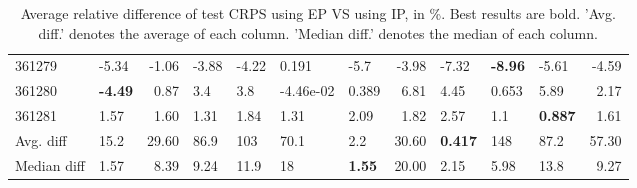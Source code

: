 \begin{table}[ht!]
\begin{tabular}{llrllllrlllr}
  361279 & -5.34 & -1.06 & -3.88 & -4.22 & 0.191 & -5.7 & -3.98 & -7.32 & \textbf{-8.96} & -5.61 & -4.59 \\ 
  361280 & \textbf{-4.49} & 0.87 & 3.4 & 3.8 & -4.46e-02 & 0.389 & 6.81 & 4.45 & 0.653 & 5.89 & 2.17 \\ 
  361281 & 1.57 & 1.60 & 1.31 & 1.84 & 1.31 & 2.09 & 1.82 & 2.57 & 1.1 & \textbf{0.887} & 1.61 \\ 
   \hline
Avg. diff & 15.2 & 29.60 & 86.9 & 103 & 70.1 & 2.2 & 30.60 & \textbf{0.417} & 148 & 87.2 & 57.30 \\ 
  Median diff & 1.57 & 8.39 & 9.24 & 11.9 & 18 & \textbf{1.55} & 20.00 & 2.15 & 5.98 & 13.8 & 9.27 \\ 
   \hline
\hline
\end{tabular}
\endgroup
\caption{Average relative difference of test CRPS using EP VS using IP, in \%. 
                  Best results are bold. 
                  'Avg. diff.' denotes the average of each column.
                  'Median diff.' denotes the median of each column.} 
\label{TABLES/table_results_CRPS_umap_only_num_EP_VS_IP}
\end{table}
